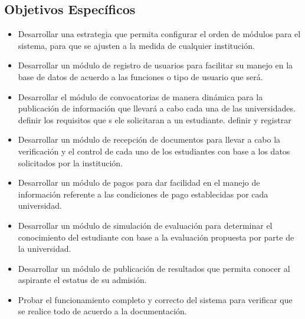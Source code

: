\subsection{Objetivos Específicos}
    
    \begin{itemize}
        \item Desarrollar una estrategia que permita configurar el orden de módulos para el sistema, para que se ajusten a la medida de cualquier institución.
        
        \item Desarrollar un módulo de registro de usuarios para facilitar su manejo en la base de datos de acuerdo a las funciones o tipo de usuario que será.
        
        \item Desarrollar el módulo de convocatorias de manera dinámica para la publicación de información que llevará a cabo cada una de las universidades.
        definir los requisitos que s ele solicitaran a un estudiante. definir y registrar 
        
        
        \item Desarrollar un módulo de recepción de documentos para llevar a cabo la verificación y el control de cada uno de los estudiantes con base a los datos solicitados por la institución.
        
        \item Desarrollar un módulo de pagos para dar facilidad en el manejo de información referente a las condiciones de pago establecidas por cada universidad.

        \item Desarrollar un módulo de simulación de evaluación para determinar el conocimiento del estudiante con base a la evaluación propuesta por parte de la universidad.
        
        \item Desarrollar un módulo de publicación de resultados que permita conocer al aspirante el estatus de su admisión.
        
        \item Probar el funcionamiento completo y correcto del sistema para verificar que se realice todo de acuerdo a la documentación.
        
    \end{itemize}